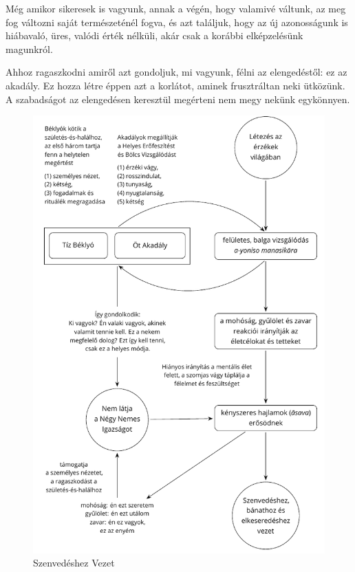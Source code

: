 Még amikor sikeresek is vagyunk, annak a végén, hogy valamivé váltunk,
az meg fog változni saját természeténél fogva, és azt találjuk, hogy az
új azonosságunk is hiábavaló, üres, valódi érték nélküli, akár csak a
korábbi elképzelésünk magunkról.

\enlargethispage*{\baselineskip}

Ahhoz ragaszkodni amiről azt gondoljuk, mi vagyunk, félni az
elengedéstől: ez az akadály. Ez hozza létre éppen azt a korlátot, aminek
frusztráltan neki ütközünk. A szabadságot az elengedésen keresztül
megérteni nem megy nekünk egykönnyen.

\cleartoverso
\figurepagelayout

\begin{figure}[h]
\vspace*{-10mm}%
\caption{Szenvedéshez Vezet}\label{fig-leading-to-suffering}

\centering

\includegraphics[width=\linewidth]{./manuscript/tex/diagrams/leading-to-suffering-hu.pdf}

\end{figure}

